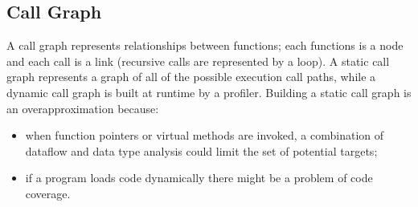 \subsection{Call Graph}
A call graph represents relationships between functions; each functions is a node and each call is a link (recursive
calls are represented by a loop). A static call graph represents a graph of all of the possible execution call paths,
while a dynamic call graph is built at runtime by a profiler. Building a static call graph is an overapproximation
because:
\begin{itemize}
    \item when function pointers or virtual methods are invoked, a combination of dataflow and data type analysis could
        limit the set of potential targets;
    \item if a program loads code dynamically there might be a problem of code coverage.
\end{itemize}

